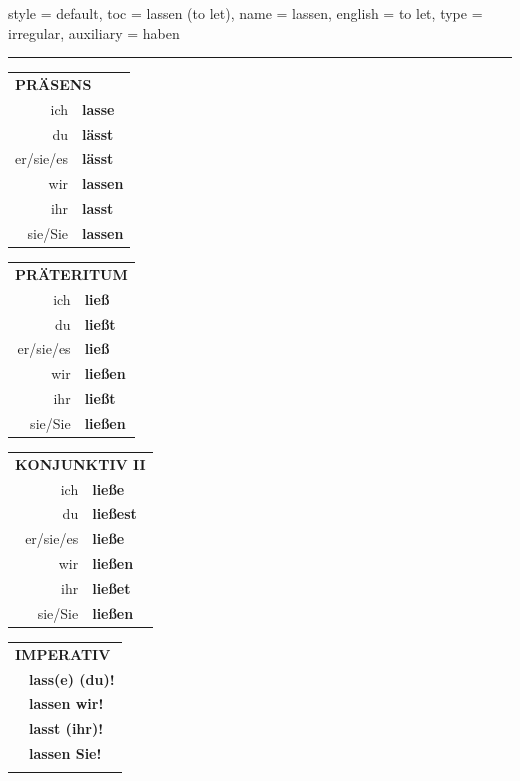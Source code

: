 \begin{verbentry}{
  style = {default},
  toc = {lassen (to let)},
  name = {lassen},
  english = {to let},
  type = {irregular},
  auxiliary = {haben}
}
 
     \vspace{5pt}
    \hrule
    \vspace{5pt}
  \begin{tabular}{rl}
     \multicolumn{2}{l}{\textbf{PRÄSENS} }\\
    ich & \textbf{lasse}\\
    du & \textbf{lässt}\\
    er/sie/es & \textbf{lässt}\\
    wir & \textbf{lassen}\\
    ihr & \textbf{lasst}\\
    sie/Sie & \textbf{lassen}\\
  \end{tabular}
  \hfill
     \begin{tabular}{rl}
    \multicolumn{2}{l}{\textbf{PRÄTERITUM} }\\
    ich & \textbf{ließ}\\
    du & \textbf{ließt}\\
    er/sie/es & \textbf{ließ}\\
    wir & \textbf{ließen}\\
    ihr & \textbf{ließt}\\
    sie/Sie & \textbf{ließen}\\
  \end{tabular}
     \hfill
     \begin{tabular}{rl}
    \multicolumn{2}{l}{\textbf{KONJUNKTIV II} }\\
    ich & \textbf{ließe}\\
    du & \textbf{ließest}\\
    er/sie/es & \textbf{ließe}\\
    wir & \textbf{ließen}\\
    ihr & \textbf{ließet}\\
    sie/Sie & \textbf{ließen}\\
  \end{tabular}
  \hfill
  \begin{tabular}{rl}
     \multicolumn{2}{l}{\textbf{IMPERATIV} }\\
   & \textbf{lass(e) (du)!}\\
   & \textbf{lassen wir!}\\
   & \textbf{lasst (ihr)!}\\
   & \textbf{lassen Sie!}\\
   & \vspace{10pt}
  \end{tabular}


\end{verbentry}
